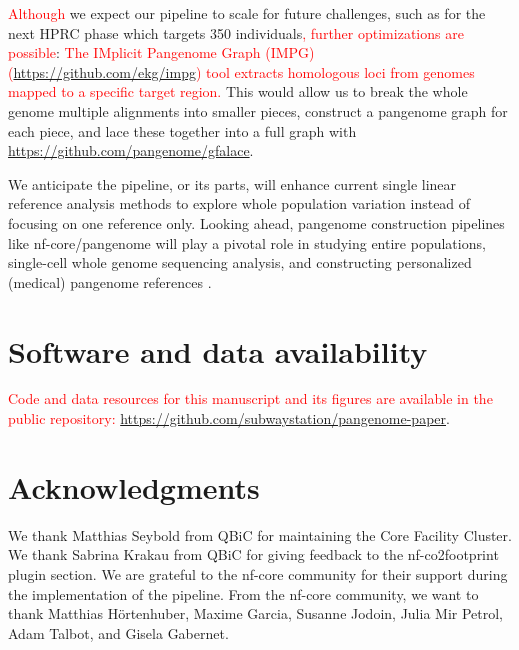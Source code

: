 \documentclass{bioinfo}
\theoremstyle{definition}
\newcommand{\red}[1]{{\textcolor{Red}{#1}}}
\begin{document}
	\red{Although} we expect our pipeline to scale for future challenges, such as for the next HPRC phase which targets 350 individuals\red{, further optimizations are possible}: 
	\red{The IMplicit Pangenome Graph (IMPG) (\href{https://github.com/ekg/impg}{https://github.com/ekg/impg}) tool extracts homologous loci from genomes mapped to a specific target region.}
	This would allow us to break the whole genome multiple alignments into smaller pieces, construct a pangenome graph for each piece, and lace these together into a full graph with \href{https://github.com/pangenome/gfalace}{https://github.com/pangenome/gfalace}. 
	
	We anticipate the pipeline, or its parts, will enhance current single linear reference analysis methods to explore whole population variation instead of focusing on one reference only. Looking ahead, pangenome construction pipelines like nf-core/pangenome will play a pivotal role in studying entire populations, single-cell whole genome sequencing analysis, and constructing personalized (medical) pangenome references \citep{Sirn2024}.
	\vspace{-0.6cm}
	\section*{Software and data availability}
	
	\red{Code and data resources for this manuscript and its figures are available in the public repository:} \href{https://github.com/subwaystation/pangenome-paper}{https://github.com/subwaystation/pangenome-paper}.
	\vspace{-0.6cm}
	\section*{Acknowledgments}

	We thank Matthias Seybold from QBiC for maintaining the Core Facility Cluster. 
	We thank Sabrina Krakau from QBiC for giving feedback to the nf-co2footprint plugin section. 
	We are grateful to the nf-core community for their support during the implementation of the pipeline. 
	From the nf-core community, we want to thank Matthias Hörtenhuber, Maxime Garcia, Susanne Jodoin, Julia Mir Petrol, Adam Talbot, and Gisela Gabernet. 
\end{document}
